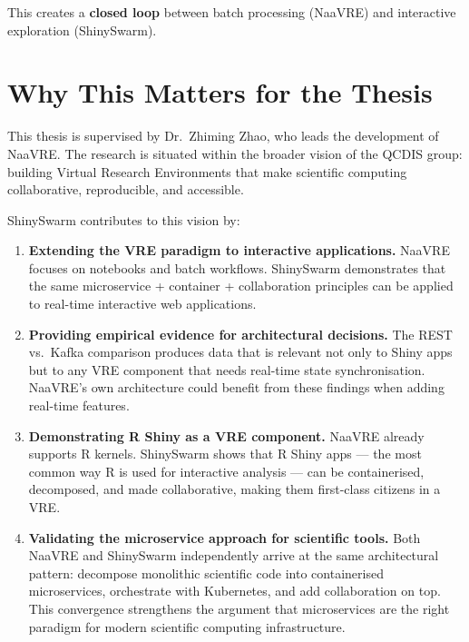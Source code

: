 \documentclass[12pt,a4paper]{article}
\begin{document}
This creates a \textbf{closed loop} between batch processing (NaaVRE) and interactive exploration (ShinySwarm).

\section{Why This Matters for the Thesis}

This thesis is supervised by Dr.\ Zhiming Zhao, who leads the development of NaaVRE. The research is situated within the broader vision of the QCDIS group: building Virtual Research Environments that make scientific computing collaborative, reproducible, and accessible.

ShinySwarm contributes to this vision by:

\begin{enumerate}[nosep]
  \item \textbf{Extending the VRE paradigm to interactive applications.} NaaVRE focuses on notebooks and batch workflows. ShinySwarm demonstrates that the same microservice + container + collaboration principles can be applied to real-time interactive web applications.
  
  \item \textbf{Providing empirical evidence for architectural decisions.} The REST vs.\ Kafka comparison produces data that is relevant not only to Shiny apps but to any VRE component that needs real-time state synchronisation. NaaVRE's own architecture could benefit from these findings when adding real-time features.
  
  \item \textbf{Demonstrating R Shiny as a VRE component.} NaaVRE already supports R kernels. ShinySwarm shows that R Shiny apps --- the most common way R is used for interactive analysis --- can be containerised, decomposed, and made collaborative, making them first-class citizens in a VRE.
  
  \item \textbf{Validating the microservice approach for scientific tools.} Both NaaVRE and ShinySwarm independently arrive at the same architectural pattern: decompose monolithic scientific code into containerised microservices, orchestrate with Kubernetes, and add collaboration on top. This convergence strengthens the argument that microservices are the right paradigm for modern scientific computing infrastructure.
\end{enumerate}
\end{document}
